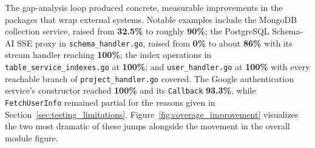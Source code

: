 The gap-analysis loop produced concrete, measurable improvements in the packages that wrap external systems. Notable examples include the MongoDB collection service, raised from \textbf{32.5\%} to roughly \textbf{90\%}; the PostgreSQL Schema-AI SSE proxy in \texttt{schema\_handler.go}, raised from \textbf{0\%} to about \textbf{86\%} with its stream handler reaching \textbf{100\%}; the index operations in \texttt{table\_service\_indexes.go} at \textbf{100\%}; and \texttt{user\_handler.go} at \textbf{100\%} with every reachable branch of \texttt{project\_handler.go} covered. The Google authentication service's constructor reached \textbf{100\%} and its \texttt{Callback} \textbf{93.3\%}, while \texttt{FetchUserInfo} remained partial for the reasons given in Section~\ref{sec:testing_limitations}. Figure~\ref{fig:coverage_improvement} visualizes the two most dramatic of these jumps alongside the movement in the overall module figure.

